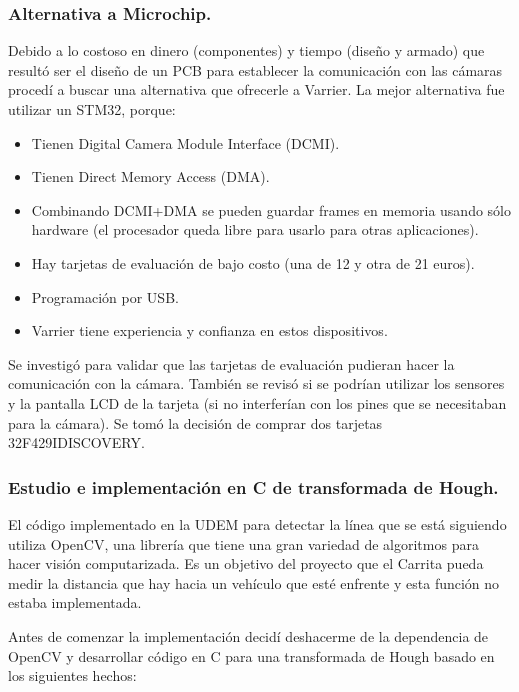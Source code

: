 \subsubsection{Alternativa a Microchip.}
Debido a lo costoso en dinero (componentes) y tiempo (diseño y armado) que resultó ser el diseño de un PCB para establecer la comunicación con las cámaras procedí a buscar una alternativa que ofrecerle a Varrier. La mejor alternativa fue utilizar un STM32, porque:
\begin{itemize}
	\item Tienen Digital Camera Module Interface (DCMI).
	\item Tienen Direct Memory Access (DMA).
	\item Combinando DCMI+DMA se pueden guardar frames en memoria usando sólo hardware (el procesador queda libre para usarlo para otras aplicaciones).
	\item Hay tarjetas de evaluación de bajo costo (una de 12 y otra de 21 euros).
	\item Programación por USB.
	\item Varrier tiene experiencia y confianza en estos dispositivos.
\end{itemize}

Se investigó para validar que las tarjetas de evaluación pudieran hacer la comunicación con la cámara. También se revisó si se podrían utilizar los sensores y la pantalla LCD de la tarjeta (si no interferían con los pines que se necesitaban para la cámara). Se tomó la decisión de comprar dos tarjetas 32F429IDISCOVERY.


\subsubsection{Estudio e implementación en C de transformada de Hough.}
El código implementado en la UDEM para detectar la línea que se está siguiendo utiliza OpenCV, una librería que tiene una gran variedad de algoritmos para hacer visión computarizada. Es un objetivo del proyecto que el Carrita pueda medir la distancia que hay hacia un vehículo que esté enfrente y esta función no estaba implementada.

Antes de comenzar la implementación decidí deshacerme de la dependencia de OpenCV y desarrollar código en C para una transformada de Hough basado en los siguientes hechos:

